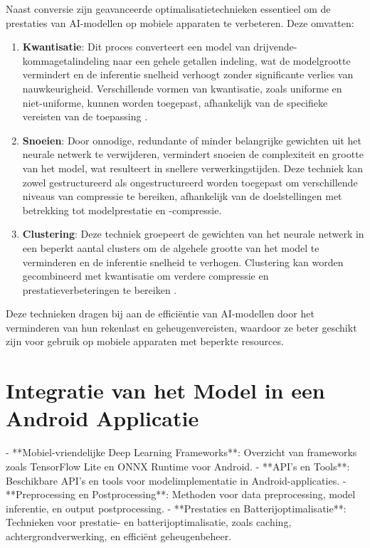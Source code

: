 Naast conversie zijn geavanceerde optimalisatietechnieken essentieel om de prestaties van AI-modellen op mobiele apparaten te verbeteren. Deze omvatten:

\begin{enumerate}
    \item \textbf{Kwantisatie}: Dit proces converteert een model van drijvende-kommagetalindeling naar een gehele getallen indeling, wat de modelgrootte vermindert en de inferentie snelheid verhoogt zonder significante verlies van nauwkeurigheid. Verschillende vormen van kwantisatie, zoals uniforme en niet-uniforme, kunnen worden toegepast, afhankelijk van de specifieke vereisten van de toepassing \autocite{Wang2022}.
    
    \item \textbf{Snoeien}: Door onnodige, redundante of minder belangrijke gewichten uit het neurale netwerk te verwijderen, vermindert snoeien de complexiteit en grootte van het model, wat resulteert in snellere verwerkingstijden. Deze techniek kan zowel gestructureerd als ongestructureerd worden toegepast om verschillende niveaus van compressie te bereiken, afhankelijk van de doelstellingen met betrekking tot modelprestatie en -compressie.
    
    \item \textbf{Clustering}: Deze techniek groepeert de gewichten van het neurale netwerk in een beperkt aantal clusters om de algehele grootte van het model te verminderen en de inferentie snelheid te verhogen. Clustering kan worden gecombineerd met kwantisatie om verdere compressie en prestatieverbeteringen te bereiken \autocite{Ye2018}.
\end{enumerate}

Deze technieken dragen bij aan de efficiëntie van AI-modellen door het verminderen van hun rekenlast en geheugenvereisten, waardoor ze beter geschikt zijn voor gebruik op mobiele apparaten met beperkte resources.


\section{Integratie van het Model in een Android Applicatie}

- **Mobiel-vriendelijke Deep Learning Frameworks**: Overzicht van frameworks zoals TensorFlow Lite en ONNX Runtime voor Android.
- **API's en Tools**: Beschikbare API's en tools voor modelimplementatie in Android-applicaties.
- **Preprocessing en Postprocessing**: Methoden voor data preprocessing, model inferentie, en output postprocessing.
- **Prestaties en Batterijoptimalisatie**: Technieken voor prestatie- en batterijoptimalisatie, zoals caching, achtergrondverwerking, en efficiënt geheugenbeheer.

